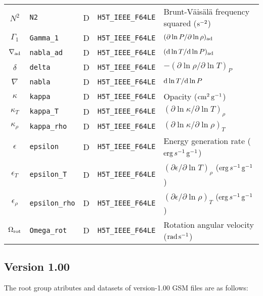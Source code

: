 \documentclass{article}
\newcommand{\diff}{\ensuremath{{\rm d}}}
\newcommand{\cm}{\ensuremath{{\rm cm}}}
\newcommand{\gram}{\ensuremath{{\rm g}}}
\newcommand{\second}{\ensuremath{{\rm s}}}
\newcommand{\erg}{\ensuremath{{\rm erg}}}
\begin{document}
\begin{table}[h!]
\begin{tabular}{|c|l|c|l|l|}
$N^{2}$           & \texttt{N2}           & D & \texttt{H5T\_IEEE\_F64LE} & Brunt-V\"ais\"al\"a frequency squared ($\second^{-2}$) \\
$\Gamma_{1}$      & \texttt{Gamma\_1}      & D & \texttt{H5T\_IEEE\_F64LE} & $(\partial \ln P/\partial \ln \rho)_{\rm ad}$ \\
$\nabla_{\rm ad}$  & \texttt{nabla\_ad}      & D & \texttt{H5T\_IEEE\_F64LE} & $(\diff \ln T/\diff \ln P)_{\rm ad}$ \\
$\delta$      & \texttt{delta}            & D & \texttt{H5T\_IEEE\_F64LE} & $-(\partial \ln \rho/\partial \ln T)_{P}$  \\
$\nabla$          & \texttt{nabla}        & D & \texttt{H5T\_IEEE\_F64LE} & $\diff \ln T/\diff \ln P$ \\
$\kappa$          & \texttt{kappa}       & D &  \texttt{H5T\_IEEE\_F64LE} & Opacity ($\cm^{2}\,\gram^{-1}$) \\
$\kappa_{T}$      & \texttt{kappa\_T}     & D &  \texttt{H5T\_IEEE\_F64LE} & $(\partial \ln \kappa/\partial \ln T)_{\rho}$ \\
$\kappa_{\rho}$   & \texttt{kappa\_rho}   & D &  \texttt{H5T\_IEEE\_F64LE} & $(\partial \ln \kappa/\partial \ln \rho)_{T}$ \\
$\epsilon$        & \texttt{epsilon}      & D &  \texttt{H5T\_IEEE\_F64LE} & Energy generation rate ($\erg\,s^{-1}\,\gram^{-1}$) \\
$\epsilon_{T}$    & \texttt{epsilon\_T}   & D &  \texttt{H5T\_IEEE\_F64LE} & $(\partial \epsilon/\partial \ln T)_{\rho}$ ($\erg\,s^{-1}\,\gram^{-1}$) \\
$\epsilon_{\rho}$ & \texttt{epsilon\_rho} & D &  \texttt{H5T\_IEEE\_F64LE} & $(\partial \epsilon/\partial \ln \rho)_{T}$ ($\erg\,s^{-1}\,\gram^{-1}$) \\
$\Omega_{\rm rot}$ & \texttt{Omega\_rot}   & D & \texttt{H5T\_IEEE\_F64LE} & Rotation angular velocity (${\rm rad}\,\second^{-1}$) \\  \hline
\end{tabular}
\end{table}

\subsection*{Version 1.00}

The root group atributes and datasets of version-1.00 GSM files are as follows:
\end{document}
